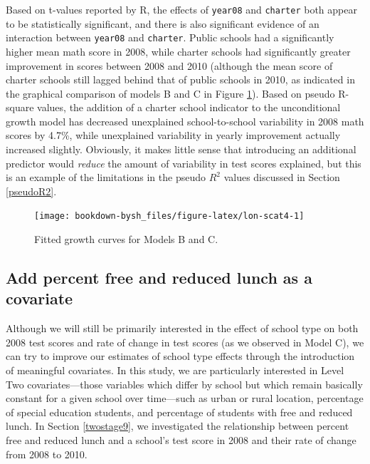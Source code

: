 \documentclass[
]{krantz}
\begin{document}
Based on t-values reported by R, the effects of \texttt{year08} and \texttt{charter} both appear to be statistically significant, and there is also significant evidence of an interaction between \texttt{year08} and \texttt{charter}. Public schools had a significantly higher mean math score in 2008, while charter schools had significantly greater improvement in scores between 2008 and 2010 (although the mean score of charter schools still lagged behind that of public schools in 2010, as indicated in the graphical comparison of models B and C in Figure \ref{fig:lon-scat4}). Based on pseudo R-square values, the addition of a charter school indicator to the unconditional growth model has decreased unexplained school-to-school variability in 2008 math scores by 4.7\%, while unexplained variability in yearly improvement actually increased slightly. Obviously, it makes little sense that introducing an additional predictor would \emph{reduce} the amount of variability in test scores explained, but this is an example of the limitations in the pseudo \(R^2\) values discussed in Section \ref{pseudoR2}.

\begin{figure}

{\centering \texttt{[image: bookdown-bysh\_files/figure-latex/lon-scat4-1]} 

}

\caption{ Fitted growth curves for Models B and C.}\label{fig:lon-scat4}
\end{figure}

\hypertarget{modeld}{%
\subsection{Add percent free and reduced lunch as a covariate}\label{modeld}}

Although we will still be primarily interested in the effect of school type on both 2008 test scores and rate of change in test scores (as we observed in Model C), we can try to improve our estimates of school type effects through the introduction of meaningful covariates. In this study, we are particularly interested in Level Two covariates---those variables which differ by school but which remain basically constant for a given school over time---such as urban or rural location, percentage of special education students, and percentage of students with free and reduced lunch. In Section \ref{twostage9}, we investigated the relationship between percent free and reduced lunch and a school's test score in 2008 and their rate of change from 2008 to 2010.
\end{document}
